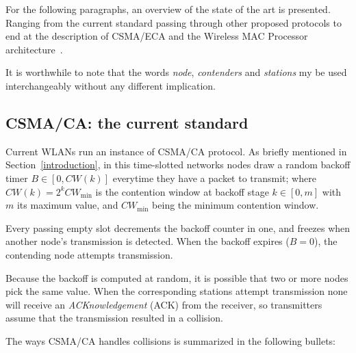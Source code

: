 For the following paragraphs, an overview of the state of the art is presented. Ranging from the current standard passing through other proposed protocols to end at the description of CSMA/ECA and the Wireless MAC Processor architecture~\cite{WMP}.

It is worthwhile to note that the words \emph{node}, \emph{contenders} and \emph{stations} my be used interchangeably without any different implication.

\subsection{CSMA/CA: the current standard}
Current WLANs run an instance of CSMA/CA protocol. As briefly mentioned in Section~\ref{introduction}, in this time-slotted networks nodes draw a random backoff timer $B\in[0,CW(k)]$ everytime they have a packet to transmit; where $CW(k)=2^{k}CW_{\min}$ is the contention window at backoff stage $k\in[0,m]$ with $m$ its maximum value, and $CW_{\min}$ being the minimum contention window.

Every passing empty slot decrements the backoff counter in one, and freezes when another node's transmission is detected. When the backoff expires ($B=0$), the contending node attempts transmission.

Because the backoff is computed at random, it is possible that two or more nodes pick the same value. When the corresponding stations attempt transmission none will receive an \emph{ACKnowledgement} (ACK) from the receiver, so transmitters assume that the transmission resulted in a collision.

The ways CSMA/CA handles collisions is summarized in the following bullets: